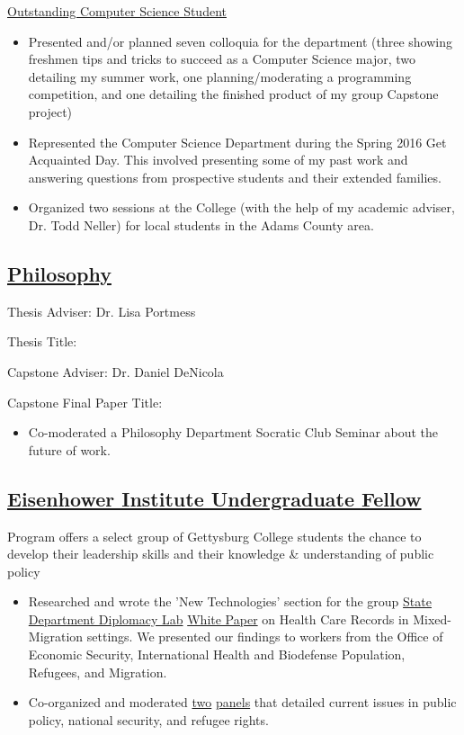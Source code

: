 \documentclass[11pt]{article}
\begin{document}
\href{http://www.gettysburg.edu/academics/cs/programs/honors.dot}{Outstanding Computer Science Student}

\begin{itemize}
\item Presented and/or planned seven colloquia for the department (three showing freshmen tips and tricks to succeed as a Computer Science major, two detailing my summer work, one planning/moderating a programming competition, and one detailing the finished product of my group Capstone project)
\item Represented the Computer Science Department during the Spring 2016 Get Acquainted Day. This involved presenting some of my past work and answering questions from prospective students and their extended families. 
\item Organized two  sessions at the College (with the help of my academic adviser, Dr. Todd Neller) for local students in the Adams County area.
\end{itemize}

\subsection*{\underline{Philosophy}}
Thesis Adviser: Dr. Lisa Portmess

Thesis Title: 

Capstone Adviser: Dr. Daniel DeNicola

Capstone Final Paper Title: 

\begin{itemize}
\item Co-moderated a Philosophy Department Socratic Club Seminar about the future of work.
\end{itemize}

\subsection*{\underline{Eisenhower Institute Undergraduate Fellow}} 
Program offers a select group of Gettysburg College students the chance to develop their leadership skills and their knowledge \& understanding of public policy
\begin{itemize}
\item Researched and wrote the 'New Technologies' section for the group \href{https://www.state.gov/s/partnerships/ppp/diplab/}{State Department Diplomacy Lab} \href{https://drive.google.com/file/d/0B5fjh9FZOHSYT1dhVF8yYmd4UEk/view?usp=sharing}{White Paper} on Health Care Records in Mixed-Migration settings. We presented our findings to workers from the Office of Economic Security, International Health and Biodefense Population, Refugees, and Migration.
\item Co-organized and moderated \href{http://cs.gettysburg.edu/~duncjo01/assets/media/EI_panel_f16.pdf}{two} \href{http://cs.gettysburg.edu/~duncjo01/assets/media/EI_panel_s17_second.pdf}{panels} that detailed current issues in public policy, national security, and refugee rights. 
\end{itemize}
\end{document}
